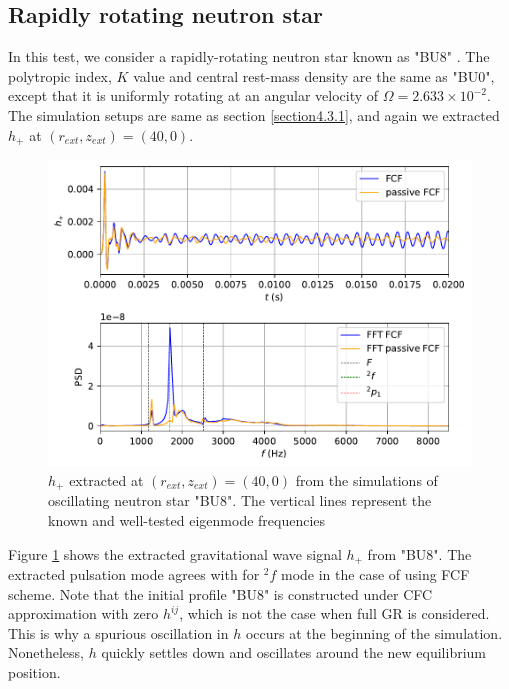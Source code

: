 \subsection{Rapidly rotating neutron star}
\label{section4.3.2}
In this test, we consider a rapidly-rotating neutron star known as "BU8" \cite{dimmelmeier2006non}.
The polytropic index, $K$ value and central rest-mass density are the same as "BU0",
except that it is uniformly rotating at an angular velocity of $\Omega = 2.633 \times 10^{-2}$.
The simulation setups are same as section \ref{section4.3.1},
and again we extracted $h_{+}$ at $(r_{ext}, z_{ext}) = (40, 0)$.\\
\begin{figure}[h!]
\centering
  \includegraphics[width=\linewidth]{GW_combine_h_BU8.pdf}
\caption{$h_{+}$ extracted at $(r_{ext}, z_{ext}) = (40, 0)$ from the simulations of oscillating neutron star "BU8".
The vertical lines represent the known and well-tested eigenmode frequencies \cite{dimmelmeier2006non}}
\label{fig:GW_h_BU8}
\end{figure}
Figure \ref{fig:GW_h_BU8} shows the extracted gravitational wave signal $h_{+}$ from "BU8".
The extracted pulsation mode agrees with \cite{dimmelmeier2006non} for ${}^2f$ mode in the case of using FCF scheme.
Note that the initial profile "BU8" is constructed under CFC approximation with zero $h^{ij}$,
which is not the case when full GR is considered.
This is why a spurious oscillation in $h$ occurs at the beginning of the simulation.
Nonetheless, $h$ quickly settles down and oscillates around the new equilibrium position.

